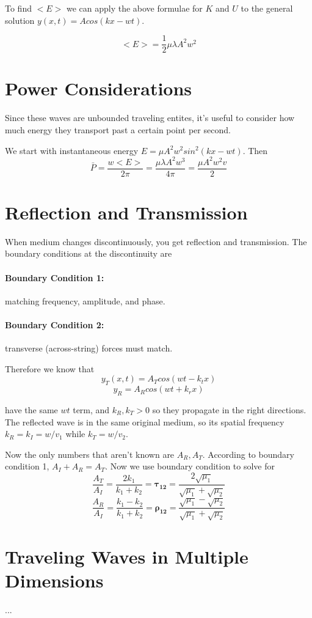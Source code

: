 \documentclass[a4paper,12pt]{report}
\begin{document}
To find $<E>$ we can apply the above formulae for $K$ and $U$ to the general solution 
$y(x, t)=A cos(kx-wt)$.

$$<E> = \frac{1}{2} \mu \lambda A^2 w^2$$

\section{Power Considerations}
Since these waves are unbounded traveling entites, it's useful to consider how much 
energy they transport past a certain point per second.

We start with instantaneous energy $E = \mu A^2 w^2 sin^2(kx - wt)$. Then 
$$\bar{P} = \frac{w <E>}{2 \pi} = \frac{\mu \lambda A^2 w^3}{4 \pi} = \frac{\mu A^2 w^2 v}{2}$$

\section{Reflection and Transmission}
When medium changes discontinuously, you get reflection and transmission. The boundary conditions 
at the discontinuity are 
\paragraph{Boundary Condition 1: } matching frequency, amplitude, and phase.
\paragraph{Boundary Condition 2: } transverse (across-string) forces must match.

Therefore we know that 
$$y_T(x, t) = A_T cos(wt - k_t x)$$ $$y_R = A_R cos (wt + k_r x)$$

have the same $wt$ term, and $k_R, k_T > 0$ so they propagate in the right directions. The reflected 
wave is in the same original medium, so its spatial frequency $k_R = k_I = w/v_1$ while $k_T = w/v_2$.

Now the only numbers that aren't known are $A_R, A_T$. According to boundary condition 1, $A_I + A_R = A_T$. 
Now we use boundary condition to solve for 
$$\frac{A_T}{A_I} = \frac{2k_1}{k_1+k_2} = \pmb{\tau_{12}} = \frac{2 \sqrt{\mu_1}}{\sqrt{\mu_1} + \sqrt{\mu_2}} $$ 
$$\frac{A_R}{A_I} = \frac{k_1 - k_2}{k_1 + k_2} = \pmb{\rho_{12}} = \frac{\sqrt{\mu_1} - \sqrt{\mu_2}}{\sqrt{\mu_1} + \sqrt{\mu_2}}$$

\section{Traveling Waves in Multiple Dimensions}
...
\end{document}
